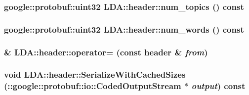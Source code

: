 \label{class_l_d_a_1_1header_ac86a02dd1ae80fac5d3e70486d5cc887}
\hypertarget{class_l_d_a_1_1header_aa766b8cbb2048e43848cef4a52002752}{
\subsubsection[{num\_\-topics}]{\setlength{\rightskip}{0pt plus 5cm}google::protobuf::uint32 LDA::header::num\_\-topics () const}}
\label{class_l_d_a_1_1header_aa766b8cbb2048e43848cef4a52002752}
\hypertarget{class_l_d_a_1_1header_ab77f21fa772258c8db0dc6511aae7a2a}{
\subsubsection[{num\_\-words}]{\setlength{\rightskip}{0pt plus 5cm}google::protobuf::uint32 LDA::header::num\_\-words () const}}
\label{class_l_d_a_1_1header_ab77f21fa772258c8db0dc6511aae7a2a}
\hypertarget{class_l_d_a_1_1header_ad6839153af87a9405065eecff9af44a9}{
\subsubsection[{operator=}]{\& LDA::header::operator= (const {\bf header} \& {\em from})}}
\label{class_l_d_a_1_1header_ad6839153af87a9405065eecff9af44a9}
\hypertarget{class_l_d_a_1_1header_af3abc1d19ca9a72f227c15c435b34393}{
\subsubsection[{SerializeWithCachedSizes}]{\setlength{\rightskip}{0pt plus 5cm}void LDA::header::SerializeWithCachedSizes (::google::protobuf::io::CodedOutputStream $\ast$ {\em output}) const}}
\label{class_l_d_a_1_1header_af3abc1d19ca9a72f227c15c435b34393}
